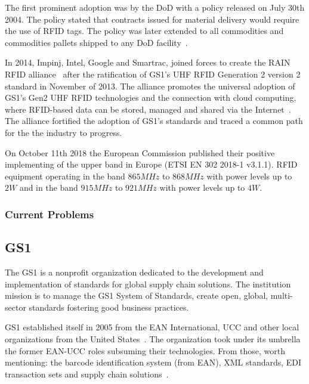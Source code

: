 The first prominent adoption was by the \gls{DoD} with a policy released on July 30th 2004. The policy stated that contracts issued for material delivery would require the use of RFID tags. The policy was later extended to all commodities and commodities pallets shipped to any \gls{DoD} facility~\cite{DoDSuppliersPassive, DODReleasesFinal}.

In 2014, Impinj, Intel, Google and Smartrac, joined forces to create the \gls{RAIN RFID} alliance~\cite{TechnologyCompaniesCreate} after the ratification of \gls{GS1}'s \gls{UHF RFID} Generation 2 version 2 standard in November of 2013. The alliance promotes the universal adoption of \gls{GS1}'s Gen2 \gls{UHF RFID} technologies and the connection with \gls{cloud computing}, where RFID-based data can be stored, managed and shared via the Internet~\cite{WhatRAINRFID}.
The alliance fortified the adoption of \gls{GS1}'s standards and traced a common path for the the industry to progress.

On October 11th 2018 the European Commission published their positive implementing of the upper band in Europe (ETSI EN 302 2018-1 v3.1.1).
\gls{RFID} equipment operating in the band $865MHz$ to $868MHz$ with power levels up to $2W$ and in the band $915MHz$ to $921MHz$ with power levels up to $4W$.


\subsubsection{Current Problems}


\subsection{GS1}

The GS1 is a nonprofit organization dedicated to the development and implementation of standards for global \gls{supply chain} solutions. 
The institution mission is to manage the GS1 System of Standards, create open, global, multi-sector standards fostering good business practices.

GS1 established itself in 2005 from the \gls{EAN} International, \gls{UCC} and other local organizations from the United States~\cite{PublicationLEBENSMITTELZEITUNGa}.
The organization took under its umbrella the former EAN-UCC roles subsuming their technologies. From those, worth mentioning: the barcode identification system (from \gls{EAN}), \gls{XML} standards, \gls{EDI} transaction sets and \gls{supply chain} solutions~\cite[p.~212]{lahiriRFIDSourcebook2005}.

